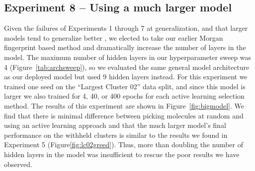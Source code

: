 \documentclass[journal=jmcmar,manuscript=article]{achemso}
\begin{document}
\subsection{Experiment 8 -- Using a much larger model}

Given the failures of Experiments 1 through 7 at generalization, and that larger models tend to generalize better \cite{bigmodelgeneralize}, we elected to take our earlier Morgan fingerprint based method and dramatically increase the number of layers in the model. The maximum number of hidden layers in our hyperparameter sweep was 4 (Figure~\ref{tab:archsweep}), so we evaluated the same general model architecture as our deployed model but used 9 hidden layers instead. For this experiment we trained one seed on the ``Largest Cluster 02'' data split, and since this model is larger we also trained for 4, 40, or 400 epochs for each active learning selection method. The results of this experiment are shown in Figure~\ref{fig:bigmodel}. We find that there is minimal difference between picking molecules at random and using an active learning approach and that the much larger model's final performance on the withheld clusters is similar to the results we found in Experiment 5 (Figure\ref{fig:lc02greed}). Thus, more than doubling the number of hidden layers in the model was insufficient to rescue the poor results we have observed.
\end{document}
